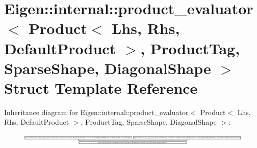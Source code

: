 \hypertarget{struct_eigen_1_1internal_1_1product__evaluator_3_01_product_3_01_lhs_00_01_rhs_00_01_default_prod80b2bd6031901e266d576d7eb3e9735}{}\section{Eigen\+:\+:internal\+:\+:product\+\_\+evaluator$<$ Product$<$ Lhs, Rhs, Default\+Product $>$, Product\+Tag, Sparse\+Shape, Diagonal\+Shape $>$ Struct Template Reference}
\label{struct_eigen_1_1internal_1_1product__evaluator_3_01_product_3_01_lhs_00_01_rhs_00_01_default_prod80b2bd6031901e266d576d7eb3e9735}
Inheritance diagram for Eigen\+:\+:internal\+:\+:product\+\_\+evaluator$<$ Product$<$ Lhs, Rhs, Default\+Product $>$, Product\+Tag, Sparse\+Shape, Diagonal\+Shape $>$\+:\begin{figure}[H]
\begin{center}
\leavevmode
\includegraphics[height=0.540019cm]{struct_eigen_1_1internal_1_1product__evaluator_3_01_product_3_01_lhs_00_01_rhs_00_01_default_prod80b2bd6031901e266d576d7eb3e9735}
\end{center}
\end{figure}
